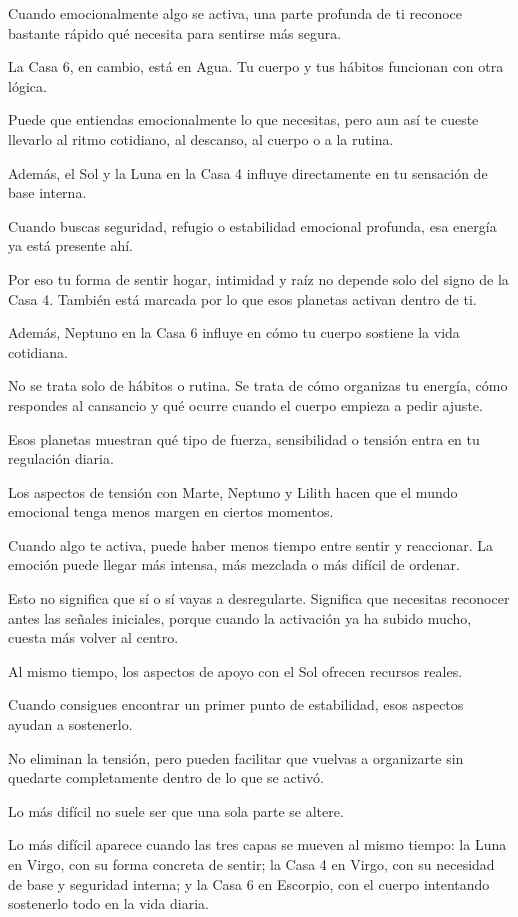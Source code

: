 \documentclass[11pt,a4paper]{article}
\begin{document}
Cuando emocionalmente algo se activa, una parte profunda de ti reconoce bastante rápido qué necesita para sentirse más segura.

La Casa 6, en cambio, está en Agua. Tu cuerpo y tus hábitos funcionan con otra lógica.

Puede que entiendas emocionalmente lo que necesitas, pero aun así te cueste llevarlo al ritmo cotidiano, al descanso, al cuerpo o a la rutina.

Además, el Sol y la Luna en la Casa 4 influye directamente en tu sensación de base interna.

Cuando buscas seguridad, refugio o estabilidad emocional profunda, esa energía ya está presente ahí.

Por eso tu forma de sentir hogar, intimidad y raíz no depende solo del signo de la Casa 4. También está marcada por lo que esos planetas activan dentro de ti.

Además, Neptuno en la Casa 6 influye en cómo tu cuerpo sostiene la vida cotidiana.

No se trata solo de hábitos o rutina. Se trata de cómo organizas tu energía, cómo respondes al cansancio y qué ocurre cuando el cuerpo empieza a pedir ajuste.

Esos planetas muestran qué tipo de fuerza, sensibilidad o tensión entra en tu regulación diaria.

Los aspectos de tensión con Marte, Neptuno y Lilith hacen que el mundo emocional tenga menos margen en ciertos momentos.

Cuando algo te activa, puede haber menos tiempo entre sentir y reaccionar. La emoción puede llegar más intensa, más mezclada o más difícil de ordenar.

Esto no significa que sí o sí vayas a desregularte. Significa que necesitas reconocer antes las señales iniciales, porque cuando la activación ya ha subido mucho, cuesta más volver al centro.

Al mismo tiempo, los aspectos de apoyo con el Sol ofrecen recursos reales.

Cuando consigues encontrar un primer punto de estabilidad, esos aspectos ayudan a sostenerlo.

No eliminan la tensión, pero pueden facilitar que vuelvas a organizarte sin quedarte completamente dentro de lo que se activó.

Lo más difícil no suele ser que una sola parte se altere.

Lo más difícil aparece cuando las tres capas se mueven al mismo tiempo:
la Luna en Virgo, con su forma concreta de sentir;
la Casa 4 en Virgo, con su necesidad de base y seguridad interna;
y la Casa 6 en Escorpio, con el cuerpo intentando sostenerlo todo en la vida diaria.
\end{document}
